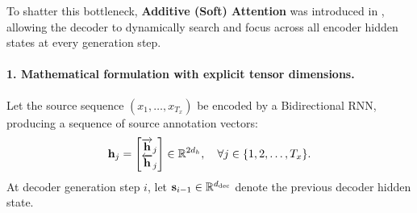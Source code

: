 \documentclass[../../main.tex]{subfiles}
\begin{document}
To shatter this bottleneck, \textbf{Additive (Soft) Attention} was introduced in \cite{bahdanau2014}, allowing the decoder to dynamically search and focus across all encoder hidden states at every generation step.

\paragraph{1. Mathematical formulation with explicit tensor dimensions.}
Let the source sequence $(x_1, \dots, x_{T_x})$ be encoded by a Bidirectional RNN, producing a sequence of source annotation vectors:
\begin{equation}
\mathbf{h}_j = \begin{bmatrix} \overrightarrow{\mathbf{h}}_j \\ \overleftarrow{\mathbf{h}}_j \end{bmatrix} \in \mathbb{R}^{2d_h}, \quad \forall j \in \{1, 2, \dots, T_x\}.
\end{equation}
At decoder generation step $i$, let $\mathbf{s}_{i-1} \in \mathbb{R}^{d_{\text{dec}}}$ denote the previous decoder hidden state.
\end{document}
